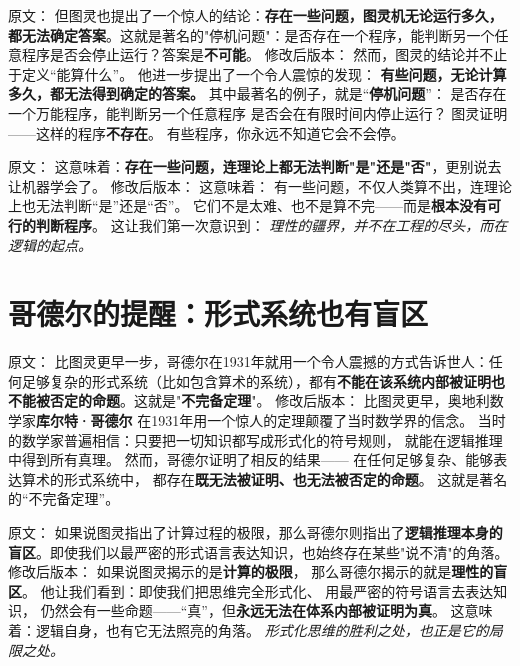 原文：
但图灵也提出了一个惊人的结论：\textbf{存在一些问题，图灵机无论运行多久，都无法确定答案}。这就是著名的"停机问题"：是否存在一个程序，能判断另一个任意程序是否会停止运行？答案是\textbf{不可能}。
修改后版本：
然而，图灵的结论并不止于定义“能算什么”。  
他进一步提出了一个令人震惊的发现：  
\textbf{有些问题，无论计算多久，都无法得到确定的答案。}  
其中最著名的例子，就是“\textbf{停机问题}”：  
是否存在一个万能程序，能判断另一个任意程序  
是否会在有限时间内停止运行？  
图灵证明——这样的程序\textbf{不存在}。  
有些程序，你永远不知道它会不会停。



原文：
这意味着：\textbf{存在一些问题，连理论上都无法判断"是"还是"否"}，更别说去让机器学会了。
修改后版本：
这意味着：  
有一些问题，不仅人类算不出，连理论上也无法判断“是”还是“否”。  
它们不是太难、也不是算不完——而是\textbf{根本没有可行的判断程序}。  
这让我们第一次意识到：  
\textit{理性的疆界，并不在工程的尽头，而在逻辑的起点。}

\section*{哥德尔的提醒：形式系统也有盲区}

原文：
比图灵更早一步，哥德尔在1931年就用一个令人震撼的方式告诉世人：任何足够复杂的形式系统（比如包含算术的系统），都有\textbf{不能在该系统内部被证明也不能被否定的命题}。这就是"\textbf{不完备定理}"。
修改后版本：
比图灵更早，奥地利数学家\textbf{库尔特·哥德尔}  
在1931年用一个惊人的定理颠覆了当时数学界的信念。  
当时的数学家普遍相信：只要把一切知识都写成形式化的符号规则，  
就能在逻辑推理中得到所有真理。  
然而，哥德尔证明了相反的结果——  
在任何足够复杂、能够表达算术的形式系统中，  
都存在\textbf{既无法被证明、也无法被否定的命题}。  
这就是著名的“不完备定理”。



原文：
如果说图灵指出了计算过程的极限，那么哥德尔则指出了\textbf{逻辑推理本身的盲区}。即使我们以最严密的形式语言表达知识，也始终存在某些"说不清"的角落。
修改后版本：
如果说图灵揭示的是\textbf{计算的极限}，  
那么哥德尔揭示的就是\textbf{理性的盲区}。  
他让我们看到：即使我们把思维完全形式化、  
用最严密的符号语言去表达知识，  
仍然会有一些命题——“真”，但\textbf{永远无法在体系内部被证明为真}。  
这意味着：逻辑自身，也有它无法照亮的角落。  
\textit{形式化思维的胜利之处，也正是它的局限之处。}



